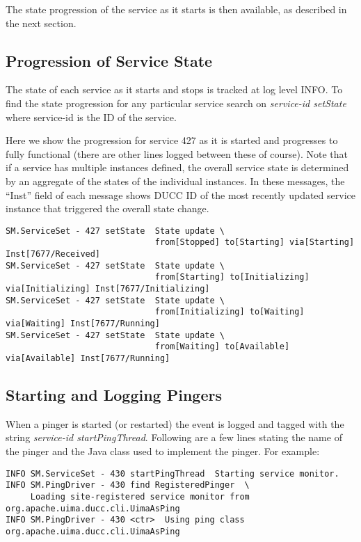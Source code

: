     The state progression of the service as it starts is then available, as described in the next section.


\subsection{Progression of Service State}

    The state of each service as it starts and stops is tracked at log level INFO.  To find the state progression
    for any particular service search on {\em service-id setState} where service-id is the ID of the service.
    
    Here we show the progression for service 427 as it is started and progresses to fully functional (there are
    other lines logged between these of course).  Note that if a service has multiple instances defined, the 
    overall service state is determined by an aggregate of the states of the individual instances.  In these
    messages, the ``Inst'' field of each message shows DUCC ID of the most recently updated  service instance 
    that triggered the overall state change.

\begin{verbatim}
SM.ServiceSet - 427 setState  State update \
                              from[Stopped] to[Starting] via[Starting] Inst[7677/Received]
SM.ServiceSet - 427 setState  State update \
                              from[Starting] to[Initializing] via[Initializing] Inst[7677/Initializing]
SM.ServiceSet - 427 setState  State update \
                              from[Initializing] to[Waiting] via[Waiting] Inst[7677/Running]
SM.ServiceSet - 427 setState  State update \
                              from[Waiting] to[Available] via[Available] Inst[7677/Running]
\end{verbatim}

\subsection{Starting and Logging Pingers}

    When a pinger is started (or restarted) the event is logged and tagged
    with the string {\em service-id startPingThread}.  Following are a few 
    lines stating the name of the pinger and the Java class used to
    implement the pinger.  For example:

\begin{verbatim}
INFO SM.ServiceSet - 430 startPingThread  Starting service monitor.
INFO SM.PingDriver - 430 find RegisteredPinger  \
     Loading site-registered service monitor from org.apache.uima.ducc.cli.UimaAsPing
INFO SM.PingDriver - 430 <ctr>  Using ping class org.apache.uima.ducc.cli.UimaAsPing
\end{verbatim}

